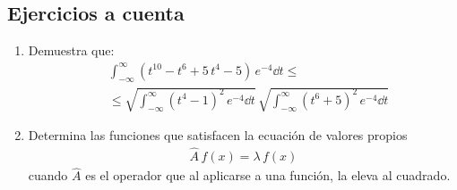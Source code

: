 \subsection{Ejercicios a cuenta}
\begin{enumerate}
\item Demuestra que:
\begin{align*}
&\int_{-\infty}^{\infty} \left( t^{10} - t^{6} + 5 \, t^{4} - 5 \right) \, e^{-4} \dd{t} \leq \\
&\leq \sqrt{\int_{-\infty}^{\infty} \left( t^{4} - 1 \right)^{2} \, e^{-4} \dd{t}} \, \sqrt{\int_{-\infty}^{\infty} \left( t^{6} + 5 \right)^{2} \, e^{-4} \dd{t}}
\end{align*}
\item Determina las funciones que satisfacen la ecuación de valores propios
\begin{align*}
\hat{A} \, f(x) = \lambda \, f(x)
\end{align*}
cuando $\hat{A}$ es el operador que al aplicarse a una función, la eleva al cuadrado.
\end{enumerate}

